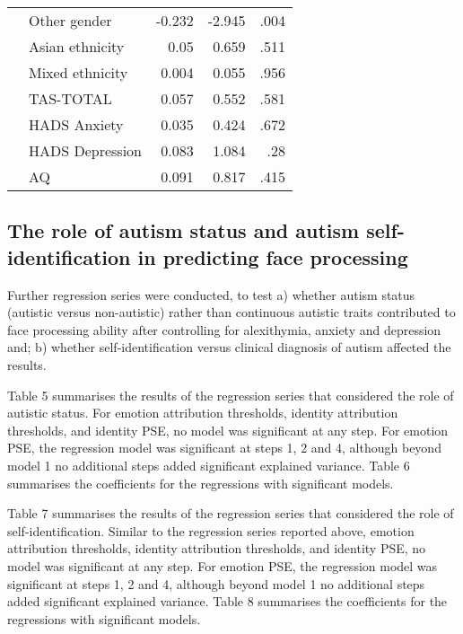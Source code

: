 \documentclass[
]{article}
\begin{document}
\begin{table}[H]
\begin{tabular}[t]{llrrr}
\addlinespace
 & Other gender & -0.232 & -2.945 & .004\\
 & Asian ethnicity & 0.05 & 0.659 & .511\\
 & Mixed ethnicity & 0.004 & 0.055 & .956\\
 & TAS-TOTAL & 0.057 & 0.552 & .581\\
 & HADS Anxiety & 0.035 & 0.424 & .672\\
\addlinespace
 & HADS Depression & 0.083 & 1.084 & .28\\
 & AQ & 0.091 & 0.817 & .415\\
\bottomrule
\end{tabular}
\end{table}

\hypertarget{the-role-of-autism-status-and-autism-self-identification-in-predicting-face-processing}{%
\subsection*{The role of autism status and autism self-identification in predicting face processing}\label{the-role-of-autism-status-and-autism-self-identification-in-predicting-face-processing}}

Further regression series were conducted, to test a) whether autism status (autistic versus non-autistic) rather than continuous autistic traits contributed to face processing ability after controlling for alexithymia, anxiety and depression and; b) whether self-identification versus clinical diagnosis of autism affected the results.

Table 5 summarises the results of the regression series that considered the role of autistic status. For emotion attribution thresholds, identity attribution thresholds, and identity PSE, no model was significant at any step. For emotion PSE, the regression model was significant at steps 1, 2 and 4, although beyond model 1 no additional steps added significant explained variance. Table 6 summarises the coefficients for the regressions with significant models.

Table 7 summarises the results of the regression series that considered the role of self-identification. Similar to the regression series reported above, emotion attribution thresholds, identity attribution thresholds, and identity PSE, no model was significant at any step. For emotion PSE, the regression model was significant at steps 1, 2 and 4, although beyond model 1 no additional steps added significant explained variance. Table 8 summarises the coefficients for the regressions with significant models.
\end{document}
